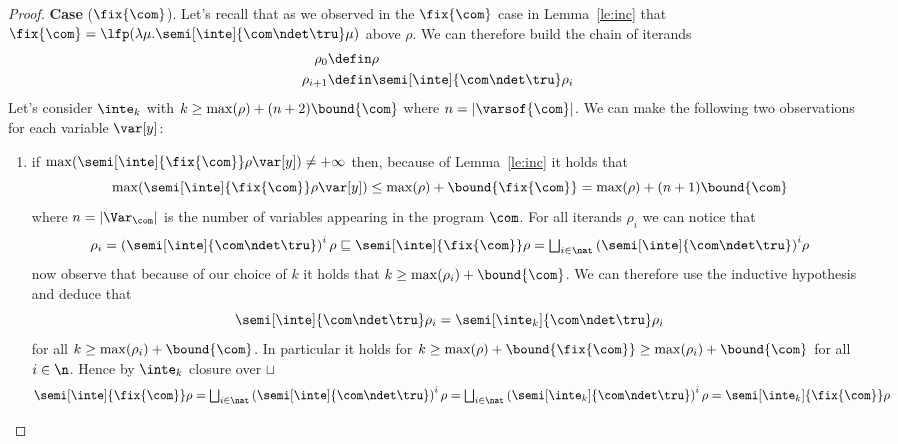 \begin{proof}
  \noindent
  \textbf{Case} (\(\fix{\com}\)).
  Let's recall that as we observed in the \(\fix{\com}\) case in
  Lemma~\ref{le:inc} that
  \({\fix{\com} = \lfp(\lambda \mu . \semi[\inte]{\com \ndet
      \tru}\mu)}\) above \(\rho\). We can therefore build the chain of
  iterands
  \begin{align*}
    \rho_0 & \defin \rho \\
    \rho_{i+1} & \defin \semi[\inte]{\com \ndet \tru}\rho_i
  \end{align*}
  Let's consider \(\inte_k\) with
  \(k \geq \max(\rho) + (n+2)\bound{\com}\) where
  \(n = |\varsof{\com}|\). We can make the following two observations
  for each variable \(\var[y]\):
  \begin{enumerate}[label=(\roman*)]
  \item if
    \({\max(\semi[\inte]{\fix{\com}}\rho\var[y])} \neq +\infty\) then,
    because of Lemma~\ref{le:inc} it holds that
    \begin{equation*}
      \max(\semi[\inte]{\fix{\com}}\rho\var[y]) \leq \max(\rho) + \bound{\fix{\com}} = \max(\rho) + (n+1)\bound{\com}
    \end{equation*}
    where \(n = |\Var_{\com}|\) is the number of variables appearing
    in the program \(\com\). For all iterands \(\rho_i\) we can notice
    that
    \begin{equation*}
      \rho_i = \left(\semi[\inte]{\com \ndet \tru}\right)^i\rho \sqsubseteq \semi[\inte]{\fix{\com}}\rho = \textstyle\bigsqcup_{i\in\nat}{\left(\semi[\inte]{\com\ndet\tru}\right)}^i\rho
    \end{equation*}
    now observe that because of our choice of \(k\) it holds that
    \({k \geq \max(\rho_i) + \bound{\com}}\). We can therefore use the
    inductive hypothesis and deduce that
    \begin{equation*}
      \semi[\inte]{\com\ndet\tru}\rho_i = \semi[\inte_k]{\com\ndet\tru}\rho_i
    \end{equation*}
    for all \(k \geq \max(\rho_i) + \bound{\com}\). In particular it
    holds for
    \(k \geq \max(\rho) + \bound{\fix{\com}} \geq \max(\rho_i) +
    \bound{\com}\) for all \(i\in\n\). Hence by \(\inte_k\) closure
    over \(\sqcup\)
    \begin{equation*}
      \semi[\inte]{\fix{\com}}\rho
      =
      \textstyle\bigsqcup_{i\in\nat}\left(\semi[\inte]{\com\ndet\tru}\right)^i\rho
      =
      \textstyle\bigsqcup_{i\in\nat}\left(\semi[\inte_k]{\com\ndet\tru}\right)^i\rho
      =
      \semi[\inte_k]{\fix{\com}}\rho
    \end{equation*}
    

\end{enumerate}
\end{proof}
